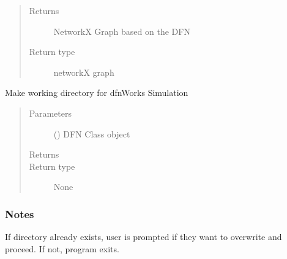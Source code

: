 \documentclass[letterpaper,10pt,english]{sphinxmanual}
\begin{document}
\begin{fulllineitems}
\begin{fulllineitems}
\begin{quote}
\begin{description}
\begin{itemize}
\end{itemize}

\item[{Returns}] \leavevmode
{} \textendash{} NetworkX Graph based on the DFN

\item[{Return type}] \leavevmode
networkX graph

\end{description}\end{quote}

\end{fulllineitems}


\begin{fulllineitems}
\label{\detokenize{pydfnworks:pydfnworks.general.dfnworks.DFNWORKS.make_working_directory}}
Make working directory for dfnWorks Simulation
\begin{quote}\begin{description}
\item[{Parameters}] \leavevmode
{} () \textendash{} DFN Class object

\item[{Returns}] \leavevmode


\item[{Return type}] \leavevmode
None

\end{description}\end{quote}
\subsubsection*{Notes}

If directory already exists, user is prompted if they want to overwrite and proceed. If not, program exits.

\end{fulllineitems}



\end{fulllineitems}
\end{document}
